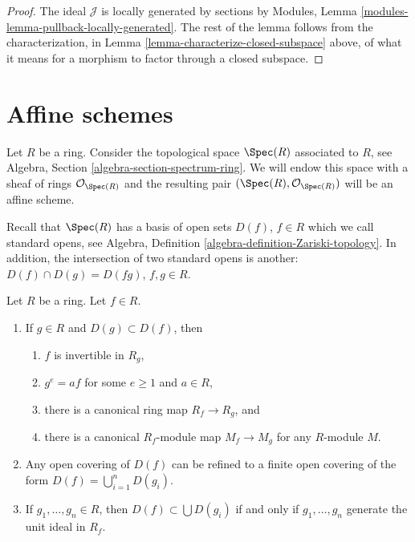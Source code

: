 \begin{proof}
The ideal $\mathcal{J}$ is locally generated by sections
by Modules, Lemma \ref{modules-lemma-pullback-locally-generated}.
The rest of the lemma follows from the characterization,
in Lemma \ref{lemma-characterize-closed-subspace} above,
of what it means for a morphism to factor through a closed
subspace.
\end{proof}














\section{Affine schemes}
\label{section-affine-schemes}

\noindent
Let $R$ be a ring. Consider the topological space $\Spec(R)$
associated to $R$, see Algebra, Section \ref{algebra-section-spectrum-ring}.
We will endow this space with a sheaf of rings $\mathcal{O}_{\Spec(R)}$
and the resulting pair $(\Spec(R), \mathcal{O}_{\Spec(R)})$
will be an affine scheme.

\medskip\noindent
Recall that $\Spec(R)$ has a basis of open sets $D(f)$,
$f \in R$ which we call standard opens, see Algebra,
Definition \ref{algebra-definition-Zariski-topology}.
In addition, the intersection of two standard opens is another:
$D(f) \cap D(g) = D(fg)$, $f, g\in R$.

\begin{lemma}
\label{lemma-standard-open}
Let $R$ be a ring. Let $f \in R$.
\begin{enumerate}
\item If $g\in R$ and $D(g) \subset D(f)$, then
\begin{enumerate}
\item $f$ is invertible in $R_g$,
\item $g^e = af$ for some $e \geq 1$ and $a \in R$,
\item there is a canonical ring map $R_f \to R_g$, and
\item there is a canonical $R_f$-module map
$M_f \to M_g$ for any $R$-module $M$.
\end{enumerate}
\item Any open covering of $D(f)$ can be refined to a finite
open covering of the form $D(f) = \bigcup_{i = 1}^n D(g_i)$.
\item If $g_1, \ldots, g_n \in R$, then $D(f) \subset \bigcup D(g_i)$
if and only if $g_1, \ldots, g_n$ generate the unit ideal in $R_f$.
\end{enumerate}
\end{lemma}

